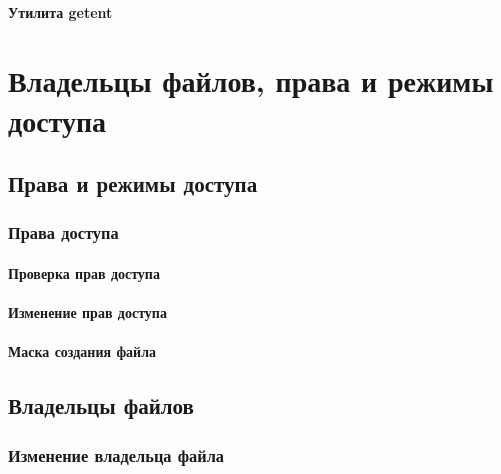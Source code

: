 \documentclass[oneside]{book}
\begin{document}
			\subsection{Утилита getent}
			
		
		


\part{Владельцы файлов, права и режимы доступа}
%

	\chapter{Права и режимы доступа}
	
	
		\section{Права доступа}
		
		
			\subsection{Проверка прав доступа}
			
			
			\subsection{Изменение прав доступа}
			
		
			\subsection{Маска создания файла}
			
			
		
	\chapter{Владельцы файлов}
	
	
		\section{Изменение владельца файла}
		
	
\end{document}
